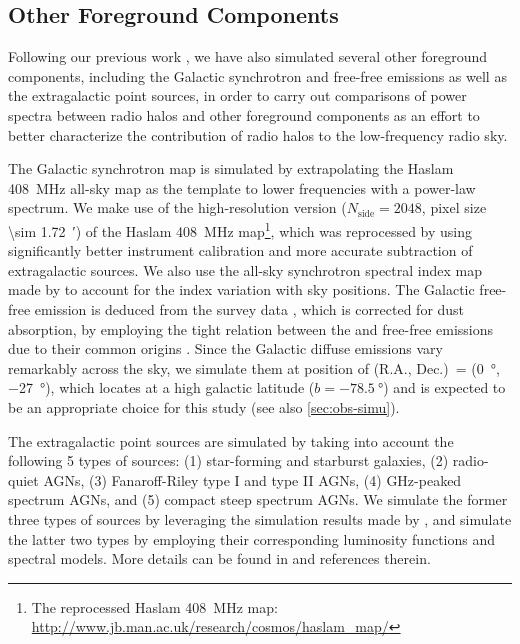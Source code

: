 \documentclass[twocolumn]{aastex62}
\newcommand{\R}[1]{\mathrm{#1}}
\newcommand{\Halpha}{\text{H$\alpha$}}
\begin{document}
\subsection{Other Foreground Components}
\label{sec:fg-other}

Following our previous work \citep{wang2010}, we have also simulated
several other foreground components, including the Galactic synchrotron
and free-free emissions as well as the extragalactic point sources,
in order to carry out comparisons of power spectra between radio halos
and other foreground components as an effort to better characterize the
contribution of radio halos to the low-frequency radio sky.

The Galactic synchrotron map is simulated by extrapolating the
Haslam \SI{408}{\MHz} all-sky map as the template to lower frequencies
with a power-law spectrum.
We make use of the high-resolution version ($N_{\R{side}} = 2048$,
pixel size \SI{\sim 1.72}{\arcminute}) of the Haslam \SI{408}{\MHz}
map\footnote{The reprocessed Haslam \SI{408}{\MHz} map:
  \url{http://www.jb.man.ac.uk/research/cosmos/haslam_map/}},
which was reprocessed by \citet{remazeilles2015} using significantly
better instrument calibration and more accurate subtraction of
extragalactic sources.
We also use the all-sky synchrotron spectral index map made by
\citet{giardino2002} to account for the index variation with sky positions.
The Galactic free-free emission is deduced from the \Halpha{} survey
data \citep{finkbeiner2003}, which is corrected for dust absorption,
by employing the tight relation between the \Halpha{} and free-free
emissions due to their common origins
\citep[see][and references therein]{dickinson2003}.
Since the Galactic diffuse emissions vary remarkably across the sky,
we simulate them at position of
(R.A., Dec.)\ = (\SI{0}{\degree}, \SI{-27}{\degree}), which locates at a
high galactic latitude ($b = \SI{-78.5}{\degree}$) and is expected to be
an appropriate choice for this study (see also \autoref{sec:obs-simu}).

The extragalactic point sources are simulated by taking into account the
following 5 types of sources: (1) star-forming and starburst galaxies,
(2) radio-quiet AGNs, (3) Fanaroff-Riley type I and type II AGNs,
(4) GHz-peaked spectrum AGNs, and (5) compact steep spectrum AGNs.
We simulate the former three types of sources by leveraging the simulation
results made by \citet{wilman2008}, and simulate the latter two types
by employing their corresponding luminosity functions and spectral models.
More details can be found in \citet{wang2010} and references therein.
\end{document}
